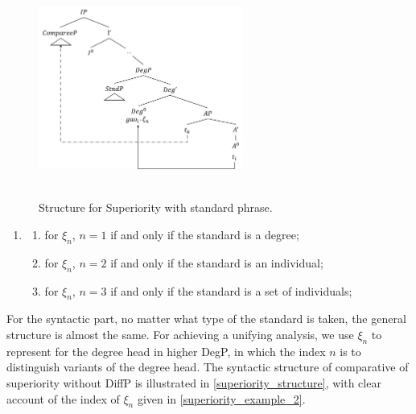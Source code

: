 \documentclass{ctexart}
\begin{document}
\begin{figure}[H]
    \centering
    \includegraphics[width=0.6\textwidth]{pic/superiority_structure.png}
    \begin{caption}
        \\ \vspace{-1.1ex}
        Structure for Superiority with standard phrase.
    \end{caption}
\end{figure}

\begin{enumerate}
    \item \label{superiority_example_2}
    \begin{enumerate}
        \item \label{superiority_example_2_a}
        for $\xi_n$, $n=1$ if and only if the standard is a degree;

        \item \label{superiority_example_2_b}
        for $\xi_n$, $n=2$ if and only if the standard is an individual;

        \item \label{superiority_example_2_c}
        for $\xi_n$, $n=3$ if and only if the standard is a set of individuals;

    \end{enumerate}
\end{enumerate}

For the syntactic part, no matter what type of the standard is taken, the general structure is almost the same. For achieving a unifying analysis, we use $\xi_n$ to represent for the degree head in higher DegP, in which the index $n$ is to distinguish variants of the degree head. The syntactic structure of comparative of superiority without DiffP is illustrated in \ref{superiority_structure}, with clear account of the index of $\xi_n$ given in \ref{superiority_example_2}.
\end{document}
